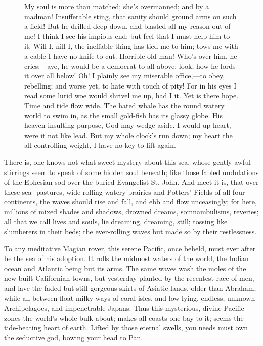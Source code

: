 \documentclass{article}
\begin{document}
\begin{figure}[!htp]
\begin{center}
{My soul is more than matched; she's overmanned; and by a madman! Insufferable sting, that sanity should ground arms on such a field! But he drilled deep down, and blasted all my reason out of me! I think I see his impious end; but feel that I must help him to it. Will I, nill I, the ineffable thing has tied me to him; tows me with a cable I have no knife to cut. Horrible old man! Who's over him, he cries;—aye, he would be a democrat to all above; look, how he lords it over all below! Oh! I plainly see my miserable office,—to obey, rebelling; and worse yet, to hate with touch of pity! For in his eyes I read some lurid woe would shrivel me up, had I it. Yet is there hope. Time and tide flow wide. The hated whale has the round watery world to swim in, as the small gold-fish has its glassy globe. His heaven-insulting purpose, God may wedge aside. I would up heart, were it not like lead. But my whole clock's run down; my heart the all-controlling weight, I have no key to lift again. 
    }
  \end{center}
\end{figure}

   There is, one knows not what sweet mystery about this sea, whose gently awful stirrings seem to speak of some hidden soul beneath; like those fabled undulations of the Ephesian sod over the buried Evangelist St. John. And meet it is, that over these sea- pastures, wide-rolling watery prairies and Potters' Fields of all four continents, the waves should rise and fall, and ebb and flow unceasingly; for here, millions of mixed shades and shadows, drowned dreams, somnambulisms, reveries; all that we call lives and souls, lie dreaming, dreaming, still; tossing like slumberers in their beds; the ever-rolling waves but made so by their restlessness.

   To any meditative Magian rover, this serene Pacific, once beheld, must ever after be the sea of his adoption. It rolls the midmost waters of the world, the Indian ocean and Atlantic being but its arms. The same waves wash the moles of the new-built Californian towns, but yesterday planted by the recentest race of men, and lave the faded but still gorgeous skirts of Asiatic lands, older than Abraham; while all between float milky-ways of coral isles, and low-lying, endless, unknown Archipelagoes, and impenetrable Japans. Thus this mysterious, divine Pacific zones the world's whole bulk about; makes all coasts one bay to it; seems the tide-beating heart of earth. Lifted by those eternal swells, you needs must own the seductive god, bowing your head to Pan.
\end{document}

